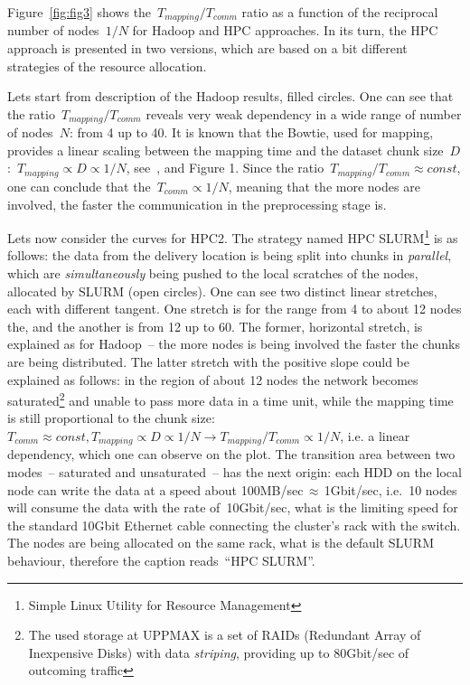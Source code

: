 \documentclass[11pt, oneside]{article}   	%
\begin{document}
Figure~\ref{fig:fig3} shows the~$T_{mapping}/T_{comm}$ ratio as a function of the reciprocal number of nodes~$1/N$ for Hadoop and HPC approaches. In its turn, the HPC approach is presented in two versions, which are based on a bit different strategies of the resource allocation.  

Lets start from description of the Hadoop results, filled circles. One can see that the ratio~$T_{mapping}/T_{comm}$ reveals very weak dependency in a wide range of number of nodes~$N$: from 4 up to 40. It is known  that the Bowtie, used for mapping, provides a linear scaling between the mapping time and the dataset chunk size~$D$:~$T_{mapping}\propto  D\propto 1/N$, see~\cite{bowtie}, and Figure 1. Since the ratio~$T_{mapping}/T_{comm}\approx const$, one can conclude that the~$T_{comm}\propto 1/N$, meaning that the more nodes are involved, the faster the communication in the preprocessing stage is. 

Lets now consider the curves for HPC2. The strategy named HPC SLURM\footnote{Simple Linux Utility for Resource Management} is as follows: the data from the delivery location is being split into chunks in {\it parallel}, which are  {\it simultaneously} being pushed  to the local scratches of the nodes, allocated by SLURM  (open circles). One can see two distinct linear stretches, each with different tangent. One stretch is for the range from 4 to about 12 nodes the, and the another is from 12 up to 60. The former, horizontal stretch, is explained as for Hadoop~-- the more nodes is being involved the faster the chunks are being distributed. The latter stretch with the positive slope could be explained as follows: in the region of about 12 nodes the network becomes saturated\footnote{The used storage at UPPMAX   is a set of RAIDs (Redundant Array of Inexpensive Disks) with data {\it striping}, providing up to $80$Gbit/sec of outcoming traffic} and unable to pass more data in a time unit, while the mapping time is still proportional to the chunk size:~$T_{comm}\approx const, T_{mapping}\propto D\propto 1/N \rightarrow T_{mapping}/T_{comm}\propto 1/N$, i.e. a linear dependency, which one can observe on the plot. 
The transition area between two modes~-- saturated and unsaturated~-- has the next origin: each HDD on the local node can write the data at a speed about 100MB/sec\,$\approx$\,1Gbit/sec, i.e.~10 nodes will consume the data with the rate of~10Gbit/sec, what is the limiting speed for the standard 10Gbit Ethernet cable connecting the cluster's rack with the switch. The nodes are being allocated  on the same rack, what is the default SLURM behaviour, therefore the caption reads~``HPC SLURM''. 
\end{document}
